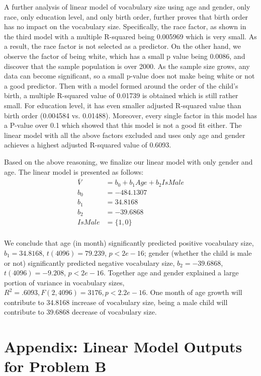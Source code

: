 \documentclass[12pt]{elsarticle}
\begin{document}
A further analysis of linear model of vocabulary size using age and gender, only race, only education level, and only birth order, further proves that birth order has no impact on the vocabulary size. Specifically, the race factor, as shown in the third model with a multiple R-squared being 0.005969 which is very small. As a result, the race factor is not selected as a predictor. On the other hand, we observe the factor of being white, which has a small p value being 0.0086, and discover that the sample population is over 2000. As the sample size grows, any data can become significant, so a small p-value does not make being white or not a good predictor. Then with a model formed around the order of the child's birth, a multiple R-squared value of 0.01739 is obtained which is still rather small. For education level, it has even smaller adjusted R-squared value than birth order (0.004584 vs. 0.01488). Moreover, every single factor in this model has a P-value over 0.1 which showed that this model is not a good fit either. The linear model with all the above factors excluded and uses only age and gender achieves a highest adjusted R-squared value of 0.6093.

Based on the above reasoning, we finalize our linear model with only gender and age. The linear model is presented as follows:
\begin{align*}
\bar{V} &= b_0 + b_1 Age + b_2 IsMale \\
b_0 &= -484.1307 \\
b_1 &= 34.8168 \\
b_2 &= -39.6868 \\
IsMale &= \{1,0\} \\
\end{align*}

We conclude that age (in month) significantly predicted positive vocabulary size, $b_1=34.8168$, $t(4096)=79.239$, $p<2e-16$; gender (whether the child is male or not) significantly predicted negative vocabulary size, $b_2=-39.6868$, $t(4096)=-9.208$, $p<2e-16$. Together age and gender explained a large portion of variance in vocabulary sizes, $R^2=.6093, F(2,4096)=3176, p<2.2e-16$. One month of age growth will contribute to 34.8168 increase of vocabulary size, being a male child will contribute to 39.6868 decrease of vocabulary size.

\appendix
\section*{Appendix: Linear Model Outputs for Problem B}
\end{document}
